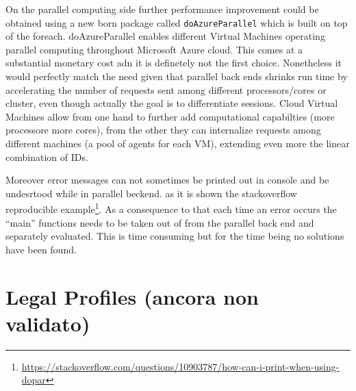 \documentclass[
  12pt,
  a4paper,
  oneside]{book}
\DeclareRobustCommand{\href}[2]{#2\footnote{\url{#1}}}
\theoremstyle{definition}
\theoremstyle{definition}
\theoremstyle{definition}
\theoremstyle{remark}
\begin{document}
On the parallel computing side further performance improvement could be obtained using a new born package called \texttt{doAzureParallel} which is built on top of the foreach. doAzureParallel enables different Virtual Machines operating parallel computing throughout Microsoft Azure cloud. This comes at a substantial monetary cost adn it is definetely not the first choice. Nonetheless it would perfectly match the need given that parallel back ends shrinks run time by accelerating the number of requests sent among different processors/cores or cluster, even though actually the goal is to differentiate sessions. Cloud Virtual Machines allow from one hand to further add computational capabilties (more processore more cores), from the other they can internalize requests among different machines (a pool of agents for each VM), extending even more the linear combination of IDs.

Moreover error messages can not sometimes be printed out in console and be undesrtood while in parallel beckend. as it is shown the \href{https://stackoverflow.com/questions/10903787/how-can-i-print-when-using-dopar}{stackoverflow reproducible example}. As a consequence to that each time an error occurs the ``main'' functions needs to be taken out of from the parallel back end and separately evaluated. This is time consuming but for the time being no solutions have been found.

\hypertarget{legal-profiles-ancora-non-validato}{%
\section{Legal Profiles (ancora non validato)}\label{legal-profiles-ancora-non-validato}}
\end{document}
